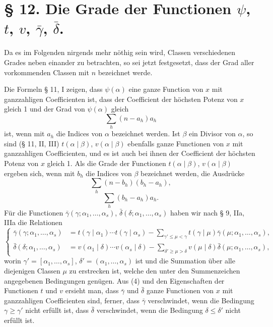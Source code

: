 \documentclass[11pt,a4paper]{article}
\begin{document}
\section*{§ 12. Die Grade der Functionen $\psi$, $t$, $v$, $\bar\gamma$, $\bar\delta$.}

Da es im Folgenden nirgends mehr nöthig sein wird, Classen verschiedenen Grades neben einander zu betrachten, so sei jetzt festgesetzt, dass der Grad aller vorkommenden Classen mit $n$ bezeichnet werde.

Die Formeln § 11, I zeigen, dass $\psi(\alpha)$ eine ganze Function von $x$ mit ganzzahligen Coefficienten ist, dass der Coefficient der höchsten Potenz von $x$ gleich 1 und der Grad von $\psi(\alpha)$ gleich
\begin{equation}
 \sum_h(n-a_h)a_h
\tag{1}
\end{equation}
ist, wenn mit $a_h$ die Indices von $\alpha$ bezeichnet werden. Ist $\beta$ ein Divisor von $\alpha$, so sind (§ 11, II, III) $t(\alpha\mid\beta)$, $v(\alpha\mid\beta)$ ebenfalls ganze Functionen von $x$ mit ganzzahligen Coefficienten, und es ist auch bei ihnen der Coefficient der höchsten Potenz von $x$ gleich 1. Als die Grade der Functionen $t(\alpha\mid\beta)$, $v(\alpha\mid\beta)$ ergeben sich, wenn mit $b_h$ die Indices von $\beta$ bezeichnet werden, die Ausdrücke
\begin{equation}
 \sum_h(n-b_h)(b_h-a_h),
\tag{2}
\end{equation}
\begin{equation}
 \sum_h(b_h-a_h)a_h.
\tag{3}
\end{equation}
Für die Functionen $\bar\gamma(\gamma;\alpha_1,\ldots,\alpha_s)$, $\bar\delta(\delta;\alpha_1,\ldots,\alpha_s)$ haben wir nach § 9, IIa, IIIa die Relationen
\begin{equation}
\left\{
\begin{aligned}
 \bar\gamma(\gamma;\alpha_1,\ldots,\alpha_s)
 &=t(\gamma\mid\alpha_1)\cdots t(\gamma\mid\alpha_s)
 -\sum_{\gamma'\le\mu<\gamma}t(\gamma\mid\mu)\bar\gamma(\mu;\alpha_1,\ldots,\alpha_s),\\
 \bar\delta(\delta;\alpha_1,\ldots,\alpha_s)
 &=v(\alpha_1\mid\delta)\cdots v(\alpha_s\mid\delta)
 -\sum_{\delta'\ge\mu>\delta}v(\mu\mid\delta)\bar\delta(\mu;\alpha_1,\ldots,\alpha_s),
\end{aligned}
\right.
\tag{4}
\end{equation}
worin $\gamma'=[\alpha_1,\ldots,\alpha_s]$, $\delta'=(\alpha_1,\ldots,\alpha_s)$ ist und die Summation über alle diejenigen Classen $\mu$ zu erstrecken ist, welche den unter den Summenzeichen angegebenen Bedingungen genügen. Aus (4) und den Eigenschaften der Functionen $t$ und $v$ ersieht man, dass $\bar\gamma$ und $\bar\delta$ ganze Functionen von $x$ mit ganzzahligen Coefficienten sind, ferner, dass $\bar\gamma$ verschwindet, wenn die Bedingung $\gamma\ge\gamma'$ nicht erfüllt ist, dass $\bar\delta$ verschwindet, wenn die Bedingung $\delta\le\delta'$ nicht erfüllt ist.
\end{document}
